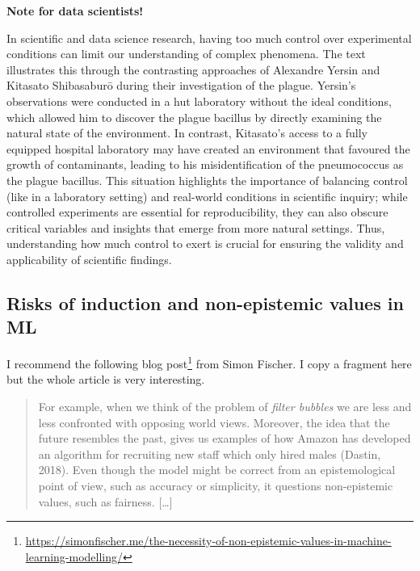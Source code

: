 \documentclass[
  12pt,
]{book}
\DeclareRobustCommand{\href}[2]{#2\footnote{\url{#1}}}
\begin{document}
\begin{tipbox}

\textbf{Note for data scientists!}

In scientific and data science research, having too much control over experimental conditions can limit our understanding of complex phenomena. The text illustrates this through the contrasting approaches of Alexandre Yersin and Kitasato Shibasaburō during their investigation of the plague. Yersin's observations were conducted in a hut laboratory without the ideal conditions, which allowed him to discover the plague bacillus by directly examining the natural state of the environment. In contrast, Kitasato's access to a fully equipped hospital laboratory may have created an environment that favoured the growth of contaminants, leading to his misidentification of the pneumococcus as the plague bacillus. This situation highlights the importance of balancing control (like in a laboratory setting) and real-world conditions in scientific inquiry; while controlled experiments are essential for reproducibility, they can also obscure critical variables and insights that emerge from more natural settings. Thus, understanding how much control to exert is crucial for ensuring the validity and applicability of scientific findings.

\end{tipbox}

\subsection{Risks of induction and non-epistemic values in ML}\label{risks-of-induction-and-non-epistemic-values-in-ml}

I recommend the following \href{https://simonfischer.me/the-necessity-of-non-epistemic-values-in-machine-learning-modelling/}{blog post} from Simon Fischer. I copy a fragment here but the whole article is very interesting.

\begin{quote}
For example, when we think of the problem of \emph{filter bubbles} we are less and less confronted with opposing world views. Moreover, the idea that the future resembles the past, gives us examples of how Amazon has developed an algorithm for recruiting new staff which only hired males (Dastin, 2018). Even though the model might be correct from an epistemological point of view, such as accuracy or simplicity, it questions non-epistemic values, such as fairness. {[}\ldots{]}
\end{quote}
\end{document}

